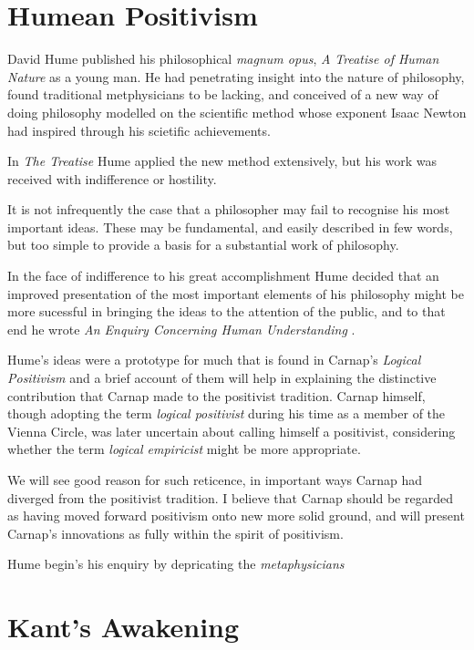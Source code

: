 \section{Humean Positivism}

David Hume published his philosophical \emph{magnum opus}, \emph{A Treatise of Human Nature} \cite{hume39}
as a young man.
He had penetrating insight into the nature of philosophy, found traditional metphysicians to
be lacking, and conceived of a new way of doing philosophy modelled on the scientific method
whose exponent Isaac Newton had inspired through his scietific achievements.

In \emph{The Treatise} Hume applied the new method extensively, but his work
was received with indifference or hostility.

It is not infrequently the case that a philosopher may fail to recognise
his most important ideas.
These may be fundamental, and easily described in few words, but too simple
to provide a basis for a substantial work of philosophy.

In the face of indifference to his great accomplishment Hume decided that
an improved presentation of the most important elements of his philosophy
might be more sucessful in bringing the ideas to the attention of the
public, and to that end he wrote \emph{An Enquiry Concerning Human Understanding} \cite{hume48}.

Hume's ideas were a prototype for much that is found in Carnap's
\emph{Logical Positivism} and a brief account of them will help in explaining the distinctive
contribution that Carnap made to the positivist tradition.
Carnap himself, though adopting the term \emph{logical positivist} during his time as
a member of the Vienna Circle, was later uncertain about calling himself a positivist,
considering whether the term \emph{logical empiricist} might be more appropriate.

We will see good reason for such reticence, in important ways Carnap had diverged from
the positivist tradition.
I believe that Carnap should be regarded as having moved forward positivism onto new
more solid ground, and will present Carnap's innovations as fully within the
spirit of positivism.

Hume begin's his enquiry by depricating the {\it metaphysicians}





\section{Kant's Awakening}

